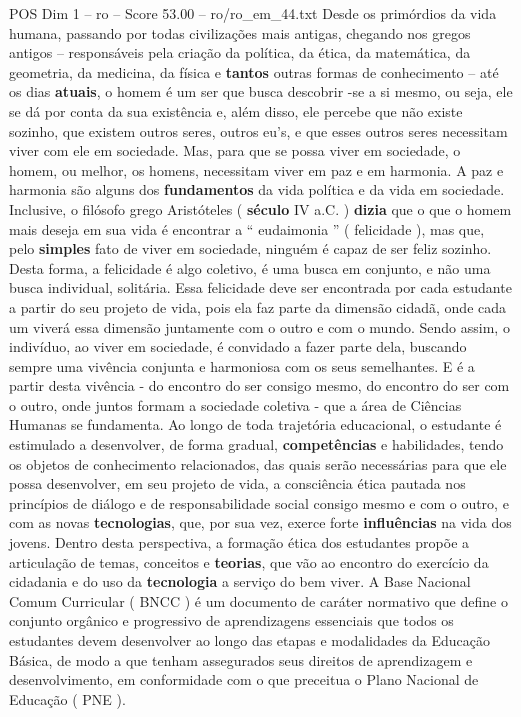 \begin{textsample}{POS Dim 1 – ro – Score 53.00 – ro/ro\_em\_44.txt}
Desde os primórdios da vida humana, passando por todas civilizações mais antigas, chegando nos gregos antigos – responsáveis pela criação da política, da ética, da matemática, da geometria, da medicina, da física e \textbf{tantos} outras formas de conhecimento – até os dias \textbf{atuais}, o homem é um ser que busca descobrir -se a si mesmo, ou seja, ele se dá por conta da sua existência e, além disso, ele percebe que não existe sozinho, que existem outros seres, outros eu’s, e que esses outros seres necessitam viver com ele em sociedade.
Mas, para que se possa viver em sociedade, o homem, ou melhor, os homens, necessitam viver em paz e em harmonia.
A paz e harmonia são alguns dos \textbf{fundamentos} da vida política e da vida em sociedade.
Inclusive, o filósofo grego Aristóteles ( \textbf{século} IV a.C. ) \textbf{dizia} que o que o homem mais deseja em sua vida é encontrar a “ eudaimonia ” ( felicidade ), mas que, pelo \textbf{simples} fato de viver em sociedade, ninguém é capaz de ser feliz sozinho.
Desta forma, a felicidade é algo coletivo, é uma busca em conjunto, e não uma busca individual, solitária.
Essa felicidade deve ser encontrada por cada estudante a partir do seu projeto de vida, pois ela faz parte da dimensão cidadã, onde cada um viverá essa dimensão juntamente com o outro e com o mundo.
Sendo assim, o indivíduo, ao viver em sociedade, é convidado a fazer parte dela, buscando sempre uma vivência conjunta e harmoniosa com os seus semelhantes.
E é a partir desta vivência - do encontro do ser consigo mesmo, do encontro do ser com o outro, onde juntos formam a sociedade coletiva - que a área de Ciências Humanas se fundamenta.
Ao longo de toda trajetória educacional, o estudante é estimulado a desenvolver, de forma gradual, \textbf{competências} e habilidades, tendo os objetos de conhecimento relacionados, das quais serão necessárias para que ele possa desenvolver, em seu projeto de vida, a consciência ética pautada nos princípios de diálogo e de responsabilidade social consigo mesmo e com o outro, e com as novas \textbf{tecnologias}, que, por sua vez, exerce forte \textbf{influências} na vida dos jovens.
Dentro desta perspectiva, a formação ética dos estudantes propõe a articulação de temas, conceitos e \textbf{teorias}, que vão ao encontro do exercício da cidadania e do uso da \textbf{tecnologia} a serviço do bem viver.
A Base Nacional Comum Curricular ( BNCC ) é um documento de caráter normativo que define o conjunto orgânico e progressivo de aprendizagens essenciais que todos os estudantes devem desenvolver ao longo das etapas e modalidades da Educação Básica, de modo a que tenham assegurados seus direitos de aprendizagem e desenvolvimento, em conformidade com o que preceitua o Plano Nacional de Educação ( PNE ).

\end{textsample}
